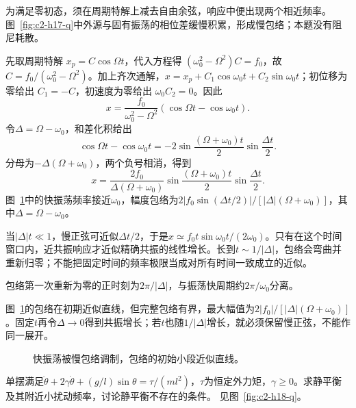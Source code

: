 \begin{solution}
为满足零初态，须在周期特解上减去自由余弦，响应中便出现两个相近频率。图~\ref{fig:c2-h17-q}中外源与固有振荡的相位差缓慢积累，形成慢包络；本题没有阻尼耗散。


先取周期特解 $x_p=C\cos\Omega t$，代入方程得 $(\omega_0^2-\Omega^2)C=f_0$，故 $C=f_0/(\omega_0^2-\Omega^2)$。加上齐次通解，$x=x_p+C_1\cos\omega_0t+C_2\sin\omega_0t$；初位移为零给出 $C_1=-C$，初速度为零给出 $\omega_0C_2=0$。因此
\[x=\frac{f_0}{\omega_0^2-\Omega^2}(\cos\Omega t-\cos\omega_0t).\]
令$\Delta=\Omega-\omega_0$，和差化积给出
\[
 \cos\Omega t-\cos\omega_0t
 =-2\sin\frac{(\Omega+\omega_0)t}{2}\sin\frac{\Delta t}{2}.
\]
分母为$-\Delta(\Omega+\omega_0)$，两个负号相消，得到
\[
 x=\frac{2f_0}{\Delta(\Omega+\omega_0)}
 \sin\frac{(\Omega+\omega_0)t}{2}\sin\frac{\Delta t}{2}.
\]
图~\ref{fig:c2-h17-s}中的快振荡频率接近$\omega_0$，幅度包络为$2|f_0\sin(\Delta t/2)|/[|\Delta|(\Omega+\omega_0)]$，其中$\Delta=\Omega-\omega_0$。

当$|\Delta|t\ll1$，慢正弦可近似$\Delta t/2$，于是$x\simeq f_0t\sin\omega_0t/(2\omega_0)$。只有在这个时间窗口内，近共振响应才近似精确共振的线性增长。长到$t\sim1/|\Delta|$，包络会弯曲并重新归零；不能把固定时间的频率极限当成对所有时间一致成立的近似。


包络第一次重新为零的正时刻为$2\pi/|\Delta|$，与振荡快周期约$2\pi/\omega_0$分离。

图~\ref{fig:c2-h17-s}的包络在初期近似直线，但完整包络有界，最大幅值为$2|f_0|/[|\Delta|(\Omega+\omega_0)]$。固定$t$再令$\Delta\to0$得到共振增长；若$t$也随$1/|\Delta|$增长，就必须保留慢正弦，不能作同一展开。

\begin{figure}[H]\centering
{}
\caption{快振荡被慢包络调制，包络的初始小段近似直线。}\label{fig:c2-h17-s}
\end{figure}
\end{solution}

\begin{exercise}[线性化的摆与受驱平衡]\label{ex:c2-h18}
单摆满足$\ddot\theta+2\gamma\dot\theta+(g/l)\sin\theta=\tau/(ml^2)$，$\tau$为恒定外力矩，$\gamma\ge0$。求静平衡及其附近小扰动频率，讨论静平衡不存在的条件。 见图~\ref{fig:c2-h18-q}。
\end{exercise}

